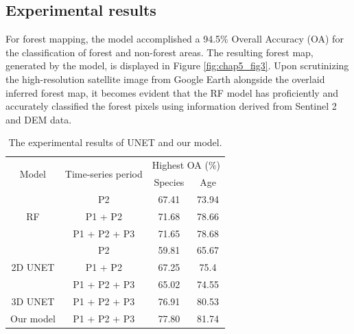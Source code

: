 \subsection{Experimental results} \label{chap5_result}
For forest mapping, the model accomplished a 94.5\% Overall Accuracy (OA) for the classification of forest and non-forest areas. The resulting forest map, generated by the model, is displayed in Figure \ref{fig:chap5_fig3}. Upon scrutinizing the high-resolution satellite image from Google Earth alongside the overlaid inferred forest map, it becomes evident that the RF model has proficiently and accurately classified the forest pixels using information derived from Sentinel 2 and DEM data. \par

\begin{table}[tbh!]
    \centering
    \caption{The experimental results of UNET and our model.}
    \begin{tabular}{cccc}
    \hline
        \multirow{2}{*}{Model} & \multirow{2}{*}{Time-series period} & \multicolumn{2}{c}{Highest OA (\%)} \\ \cline{3-4}
        ~ & ~ & Species & Age \\ \hline
        \multirow{3}{*}{RF} & P2 & 67.41 & 73.94 \\ 
        ~ & P1 + P2 & 71.68 & 78.66 \\ 
        ~ & P1 + P2 + P3 & 71.65 & 78.68 \\ \hline
        \multirow{3}{*}{2D UNET} & P2 & 59.81 & 65.67 \\ 
        ~ & P1 + P2 & 67.25 & 75.4 \\ 
        ~ & P1 + P2 + P3 & 65.02 & 74.55 \\ \hline
        3D UNET & P1 + P2 + P3 & 76.91 & 80.53 \\ 
        Our model & P1 + P2 + P3 & 77.80 & 81.74 \\ \hline
    \end{tabular}
    \label{tab:chap5_tab2}
\end{table}


